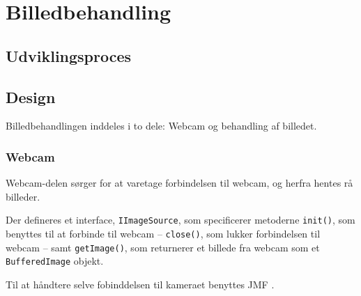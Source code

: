 \chapter{Billedbehandling}\label{cha:ip}
\section{Udviklingsproces}

\section{Design}
Billedbehandlingen inddeles i to dele: Webcam og behandling af billedet.

\subsection{Webcam}
Webcam-delen sørger for at varetage forbindelsen til webcam, og herfra hentes rå billeder.

Der defineres et interface, \texttt{IImageSource}, som specificerer metoderne \texttt{init()}, som benyttes til at forbinde til webcam -- \texttt{close()}, som lukker forbindelsen til webcam -- samt \texttt{getImage()}, som returnerer et billede fra webcam som et \texttt{BufferedImage} objekt.

Til at håndtere selve fobinddelsen til kameraet benyttes JMF .

\begin{comment}
Opbygning
	Webcam -> behandling
	JMF
\end{comment}

